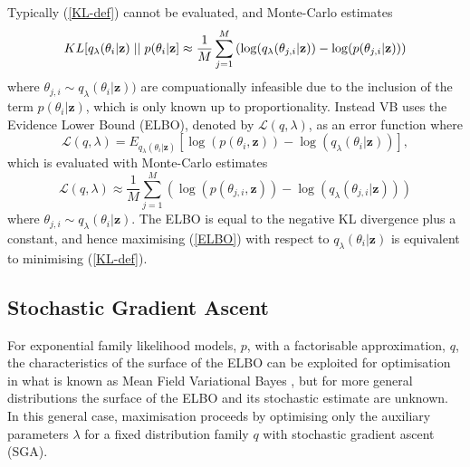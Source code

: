 \documentclass[12pt,a4paper]{article}\usepackage[]{graphicx}\usepackage[]{color}
\begin{document}
Typically (\ref{KL-def}) cannot be evaluated, and Monte-Carlo estimates
\begin{equation}
\label{KL-MC}
KL[q_{\lambda}(\theta_i | \textbf{z})\hspace{.1cm}||\hspace{.1cm}p(\theta_i | \textbf{z}] \approx \frac{1}{M}\sum_{j=1}^M \left(\log(q_{\lambda}(\theta_{j, i} | \textbf{z})) - \log(p(\theta_{j, i} | \textbf{z})) \right)
\end{equation}
where $\theta_{j, i} \sim q_{\lambda}(\theta_i | \textbf{z}))$ are compuationally infeasible due to the inclusion of the term $p(\theta_i | \textbf{z})$, which is only known up to proportionality. Instead VB uses the Evidence Lower Bound (ELBO), denoted by $\mathcal{L}(q, \lambda)$, as an error function where
\begin{equation}
\label{ELBO}
\mathcal{L}(q, \lambda) = E_{q_{\lambda}(\theta_i | \textbf{z})} \left[\log(p(\theta_i, \textbf{z})) - \log(q_{\lambda}(\theta_i | \textbf{z}))\right],
\end{equation}
which is evaluated with Monte-Carlo estimates
\begin{equation}
\label{ELBO-MC}
\mathcal{L}(q, \lambda) \approx \frac{1}{M} \sum_{j=1}^M \left(\log(p(\theta_{j, i}, \textbf{z})) - \log(q_{\lambda}(\theta_{j, i} | \textbf{z})) \right)
\end{equation}
where $\theta_{j, i} \sim q_{\lambda}(\theta_i | \textbf{z})$. The ELBO is equal to the negative KL divergence plus a constant, and hence maximising (\ref{ELBO}) with respect to $q_{\lambda}(\theta_i | \textbf{z})$ is equivalent to minimising (\ref{KL-def}).

\subsection{Stochastic Gradient Ascent}
\label{subsec:SGA}
For exponential family likelihood models, $p$, with a factorisable approximation, $q$, the characteristics of the surface of the ELBO can be exploited for optimisation in what is known as Mean Field Variational Bayes \citep{Jordan1999, Ghahramani2000, Wainwright2008}, but for more general distributions the surface of the ELBO and its stochastic estimate are unknown. In this general case, maximisation proceeds by optimising only the auxiliary parameters $\lambda$ for a fixed distribution family $q$ with stochastic gradient ascent (SGA).
\\
\end{document}
